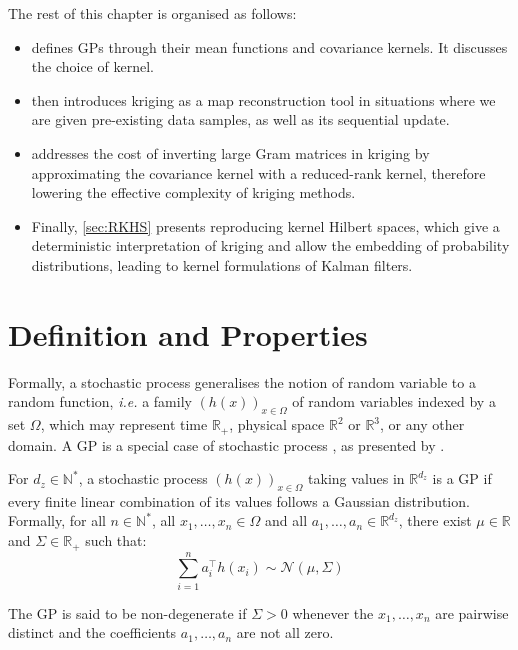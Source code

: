 The rest of this chapter is organised as follows:
\begin{itemize}
	\item{} defines GPs through their mean functions and covariance kernels. It discusses the choice of kernel.
	\item{} then introduces kriging as a map reconstruction tool in situations where we are given pre-existing data samples, as well as its sequential update.
	\item{} addresses the cost of inverting large Gram matrices in kriging by approximating the covariance kernel with a reduced-rank kernel, therefore lowering the effective complexity of kriging methods.
	\item Finally, \cref{sec:RKHS} presents reproducing kernel Hilbert spaces, which give a deterministic interpretation of kriging and allow the embedding of probability distributions, leading to kernel formulations of Kalman filters.
\end{itemize}

\section{Definition and Properties}\label{sec:GP_definition}

Formally, a stochastic process generalises the notion of random variable to a random function, \textit{i.e.} a family $(h(x))_{x\in\Omega}$ of random variables indexed by a set $\Omega$, which may represent time $\mathbb{R}_+$, physical space $\mathbb{R}^2$ or $\mathbb{R}^3$, or any other domain. A GP is a special case of stochastic process \cite{bib:random-fields}, as presented by .

\begin{definition}\label{th:GP_definition}
	For $d_z\in\mathbb{N}^*$, a stochastic process $(h(x))_{x\in\Omega}$ taking values in $\mathbb{R}^{d_z}$ is a GP if every finite linear combination of its values follows a Gaussian distribution. Formally, for all $n\in\mathbb{N}^*$, all $x_1,\dots,x_n\in\Omega$ and all $a_1,\dots,a_n\in\mathbb{R}^{d_z}$, there exist $\mu\in\mathbb{R}$ and $\Sigma\in\mathbb{R}_+$ such that:
	\begin{equation}
		\sum_{i=1}^na_i^\top h(x_i)\sim\mathcal{N}(\mu,\Sigma)
	\end{equation}

	The GP is said to be non-degenerate if $\Sigma>0$ whenever the $x_1,\dots,x_n$ are pairwise distinct and the coefficients $a_1,\dots,a_n$ are not all zero.
\end{definition}

